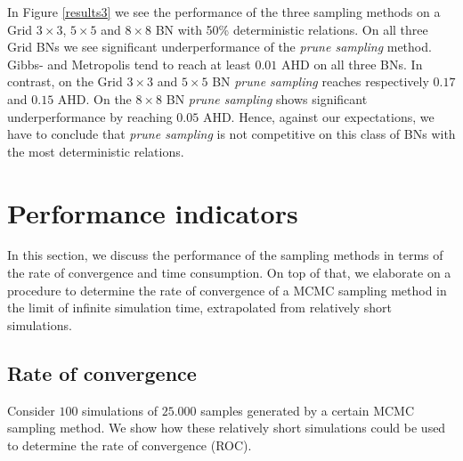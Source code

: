 \documentclass[a4paper, twoside, 11pt]{report}
\theoremstyle{plain}
\theoremstyle{definition}
\theoremstyle{remark}
\newcommand{\ps}{\textit{prune sampling }}
\begin{document}
In Figure \ref{results3} we see the performance of the three sampling methods on a Grid $3 \times 3$, $5 \times 5$ and $8 \times 8$ BN with 50\% deterministic relations. On all three Grid BNs we see significant underperformance of the \ps method. Gibbs- and Metropolis tend to reach at least $0.01$ AHD on all three BNs. In contrast, on the Grid $3 \times 3$ and $5 \times 5$ BN \ps reaches respectively $0.17$ and $0.15$ AHD. On the $8 \times 8$ BN \ps shows significant underperformance by reaching $0.05$ AHD. Hence, against our expectations, we have to conclude that \ps is not competitive on this class of BNs with the most deterministic relations.

\section{Performance indicators}
In this section, we discuss the performance of the sampling methods in terms of the rate of convergence and time consumption. On top of that, we elaborate on a procedure to determine the rate of convergence of a MCMC sampling method in the limit of infinite simulation time, extrapolated from relatively short simulations.

\subsection{Rate of convergence}
Consider $100$ simulations of $25.000$ samples generated by a certain MCMC sampling method. We show how these relatively short simulations could be used to determine the rate of convergence (ROC). \\
\end{document}
